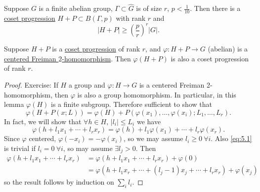 \documentclass{article}
\numberwithin{equation}{section}
\begin{document}
\begin{nprop}\label{prop:5.3}
  Suppose $G$ is a finite abelian group, $\Gamma \subset \hat{G}$ is of size $r$, $p < \frac{1}{10}$.
  Then there is a \hyperlink{def:prog}{coset progression} $H+P \subset B(\Gamma,p)$ with rank $r$ and
  \begin{equation*}
    |H+P| \geq \left(\frac pr\right)^r |G|.
  \end{equation*}
\end{nprop}
\begin{nlemma}\label{lem:5.4}
  Suppose $H+P$ is a \hyperlink{def:prog}{coset progression} of rank $r$, and $\varphi: H + P \to G$ (abelian) is a \hyperlink{def:fhom}{centered Freiman $2$-homomorphism}.
  Then $\varphi(H+P)$ is also a coset progression of rank $r$.
\end{nlemma}
\begin{proof}
  Exercise: If $H$ a group and $\varphi:H \to G$ is a centered Freiman 2-homomorphism, then $\varphi$ is also a group homomorphism.
  In particular, in this lemma $\varphi(H)$ is a finite subgroup. Therefore sufficient to show that
  \begin{equation*}
    \varphi(H + P(x;L)) = \varphi(H) + P(\varphi(x_1), \dotsc, \varphi(x_i); L_1, \dotsc, L_r).
  \end{equation*}
  In fact, we will show that $\forall h \in H$, $|l_i| \leq L_i$ we have
  \begin{equation}
    \varphi(h+l_1 x_1 + \dotsb + l_r x_r) = \varphi(h) + l_1 \varphi(x_1) + \dotsb + l_r \varphi(x_r).\label{eq:5.1}
  \end{equation}
  Since $\varphi$ centered, $\varphi(-x_i) = -\varphi(x_i)$, so we may assume $l_i \geq 0 \ \forall i$.
  Also \eqref{eq:5.1} is trivial if $l_i = 0 \ \forall i$, so may assume $\exists l_j > 0$. Then
  \begin{align*}
    \varphi(h + l_1 x_1 + \dotsb + l_r x_r) &= \varphi(h + l_1 x_1 + \dotsb + l_r x_r) + \varphi(0) \\
                                            &= \varphi(h + l_1 x_r + \dotsb + (l_j-1) x_j + \dotsb + l_r x_r) + \varphi(x_j)
  \end{align*}
  so the result follows by induction on $\sum_i l_i$.
\end{proof}
\end{document}
